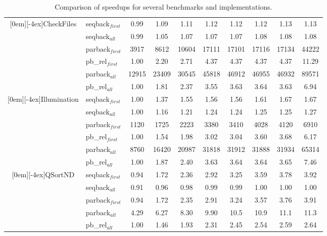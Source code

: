 \documentclass{tlp}
\newcommand{\compressfigure}{\vspace{-1em}}
\begin{document}
\begin{table}[t]
{\begin{tabular}[b]{|c||l||c|c|c|c|c|c|c|c|}
    \raisebox{-4ex}[0em][-4ex]{CheckFiles}
& \textsf{seqback$_{first}$} & 0.99 & 1.09 & 1.11 & 1.12 & 1.12 & 1.12 & 1.13 & 1.13 
    \\\cline{2-10}
& \textsf{seqback$_{all}$}   & 0.99 & 1.05 & 1.07 & 1.07 & 1.07 & 1.08 & 1.08 & 1.08 
    \\\cline{2-10}
    & \textsf{parback$_{first}$}   & 3917 & 8612 & 10604 & 17111 & 17101 & 17116 & 17134 & 44222 
    \\\cline{2-10}
    & \textsf{pb\_rel$_{first}$}   &  1.00 & 2.20 & 2.71 & 4.37 & 4.37 & 4.37 & 4.37 & 11.29    
    \\\cline{2-10}
    & \textsf{parback$_{all}$}     & 12915 & 23409 & 30545 & 45818 & 46912 & 46955 & 46932 & 89571 
    \\\cline{2-10}
    & \textsf{pb\_rel$_{all}$}     & 1.00 & 1.81 & 2.37 & 3.55 & 3.63 & 3.64 & 3.63 & 6.94    
    \\\cline{1-10}

    \raisebox{-4ex}[0em][-4ex]{Illumination}
    & \textsf{seqback$_{first}$}  & 1.00 & 1.37 & 1.55 & 1.56 & 1.56 & 1.61 & 1.67 & 1.67
\\\cline{2-10} 
    & \textsf{seqback$_{all}$}    & 1.00 & 1.16 & 1.21 & 1.24 & 1.24 & 1.25 & 1.25 & 1.27 
\\\cline{2-10} 
    & \textsf{parback$_{first}$}    & 1120 & 1725 & 2223 & 3380 & 3410 & 4028 & 4120 & 6910
    \\\cline{2-10}
    & \textsf{pb\_rel$_{first}$}    & 1.00 & 1.54 & 1.98 & 3.02 & 3.04 & 3.60 & 3.68 & 6.17 
    \\\cline{2-10} 
    & \textsf{parback$_{all}$}      & 8760 & 16420 & 20987 & 31818 & 31912 & 31888 & 31934 & 65314  
    \\\cline{2-10}
    & \textsf{pb\_rel$_{all}$}      & 1.00 & 1.87 & 2.40 & 3.63 & 3.64 & 3.64 & 3.65 & 7.46 
    \\\cline{1-10}

    \raisebox{-4ex}[0em][-4ex]{QSortND}
    & \textsf{seqback$_{first}$}  & 0.94 & 1.72 & 2.36 & 2.92 & 3.25 & 3.59 & 3.78 & 3.92
    \\\cline{2-10} 
    & \textsf{seqback$_{all}$}    & 0.91 & 0.96 & 0.98 & 0.99 & 0.99 & 1.00 & 1.00 & 1.00
    \\\cline{2-10} 
    & \textsf{parback$_{first}$}    & 0.94 & 1.72 & 2.35 & 2.91 & 3.24 & 3.57 & 3.76 & 3.91
    \\\cline{2-10} 
    & \textsf{parback$_{all}$}      & 4.29 & 6.27 & 8.30 & 9.90 & 10.5 & 10.9 & 11.1 & 11.3 
    \\\cline{2-10}
    & \textsf{pb\_rel$_{all}$}      & 1.00 & 1.46 & 1.93 & 2.31 & 2.45 & 2.54 & 2.59 & 2.64 
    \\\cline{1-10}
  \end{tabular}}\hspace*{8em}
  \caption{Comparison of speedups for several benchmarks and implementations.}
  \label{tab:speedup_results}
\compressfigure
\vspace{-1ex}
\end{table}
\end{document}
